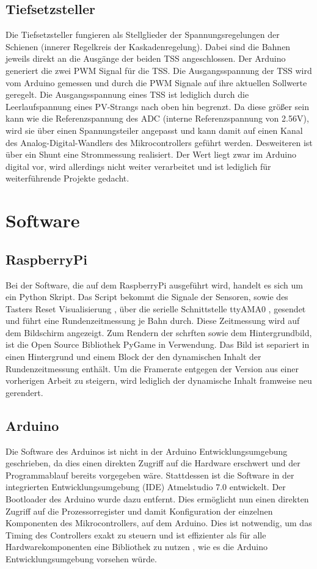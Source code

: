 \documentclass[a4paper, 11pt]{report}
\begin{document}
	\section{Tiefsetzsteller}
		Die Tiefsetzsteller fungieren als Stellglieder der Spannungsregelungen der Schienen (innerer Regelkreis der Kaskadenregelung).
		Dabei sind die Bahnen jeweils direkt an die Ausgänge der beiden TSS angeschlossen.
	  Der Arduino generiert die zwei PWM Signal für die TSS.
		Die Ausgangsspannung der TSS wird vom Arduino gemessen und durch die PWM Signale auf ihre aktuellen Sollwerte geregelt.
		Die Ausgangsspannung eines TSS ist lediglich durch die Leerlaufspannung eines PV-Strangs %
		nach oben hin begrenzt.
		Da diese größer sein kann wie die Referenzspannung des ADC (interne Referenzspannung von 2.56V), wird sie über einen Spannungsteiler angepasst und kann damit auf einen Kanal des Analog-Digital-Wandlers des Mikrocontrollers geführt werden.
		Desweiteren ist über ein Shunt eine Strommessung realisiert.
		Der Wert liegt zwar im Arduino digital vor, wird allerdings nicht weiter
		verarbeitet und ist lediglich für weiterführende Projekte gedacht.

\chapter{Software}
	\section{RaspberryPi}\label{sec:SoftPi}

		Bei der Software, die auf dem RaspberryPi ausgeführt wird, handelt es sich um ein Python Skript.
		Das Script bekommt die Signale der Sensoren, sowie des Tasters \glqq Reset Visualisierung \grqq, über die serielle Schnittstelle \glqq ttyAMA0 \grqq, gesendet und führt eine Rundenzeitmessung je Bahn durch.
		Diese Zeitmessung wird auf dem Bildschirm angezeigt.
		Zum Rendern der schrften sowie dem Hintergrundbild, ist die Open Source Bibliothek \glqq PyGame\grqq{} in Verwendung.
		Das Bild ist separiert in einen Hintergrund und einem Block der den dynamischen Inhalt der Rundenzeitmessung enthält.
		Um die Framerate entgegen der Version aus einer vorherigen Arbeit zu steigern, wird lediglich der dynamische Inhalt framweise neu gerendert.
	\section{Arduino}
		Die Software des Arduinos ist nicht in der Arduino Entwicklungsumgebung geschrieben, da dies einen direkten Zugriff auf die Hardware erschwert und der Programmablauf bereits vorgegeben wäre.
		Stattdessen ist die Software in der integrierten Entwicklungsumgebung (IDE) \glqq Atmelstudio 7.0\grqq{} entwickelt.
		Der Bootloader des Arduino wurde dazu entfernt.
		Dies ermöglicht nun einen direkten Zugriff auf die Prozessorregister und damit Konfiguration der einzelnen Komponenten des Mikrocontrollers, auf dem Arduino.
		Dies ist notwendig, um das Timing des Controllers exakt zu steuern und ist effizienter als für alle Hardwarekomponenten eine Bibliothek zu nutzen , wie es die Arduino Entwicklungsumgebung vorsehen würde.
\end{document}
